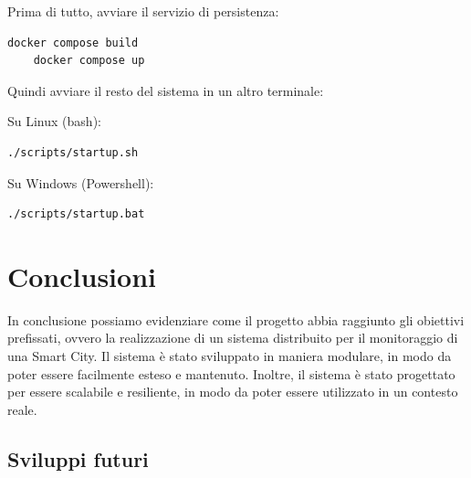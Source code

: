 \documentclass{scrartcl}
\begin{document}
Prima di tutto, avviare il servizio di persistenza:

\begin{lstlisting}[language=bash]
    docker compose build
    docker compose up
\end{lstlisting}
Quindi avviare il resto del sistema in un altro terminale:

Su Linux (bash):

\begin{lstlisting}[language=bash]
    ./scripts/startup.sh
\end{lstlisting}

Su Windows (Powershell):

\begin{lstlisting}[language=bash]
    ./scripts/startup.bat
\end{lstlisting}

\section{Conclusioni}

In conclusione possiamo evidenziare come il progetto abbia raggiunto gli obiettivi prefissati, ovvero la realizzazione di un sistema distribuito per il monitoraggio di una Smart City. Il sistema è stato sviluppato in maniera modulare, in modo da poter essere facilmente esteso e mantenuto. Inoltre, il sistema è stato progettato per essere scalabile e resiliente, in modo da poter essere utilizzato in un contesto reale.

\subsection{Sviluppi futuri}
\end{document}

